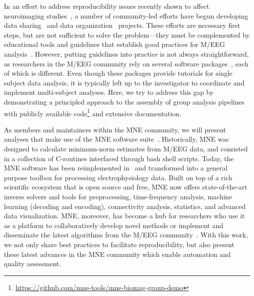 In an effort to address reproducibility issues recently shown to affect neuroimaging studies~\citep{ioannidis2005most, button2013power,Carp2012,Carp2012289}, a number of community-led efforts have begun developing data sharing~\citep{poldrack2017openfmri} and data organization~\citep{gorgolewski2016brain, galan2017meg} projects. These efforts are necessary first steps, but are not sufficient to solve the problem---they must be complemented by educational tools and guidelines that establish good practices for M/EEG analysis~\citep{gross-etal:13}. However, putting guidelines into practice is not always straightforward, as researchers in the M/EEG community rely on several software packages~\citep{tadel2011brainstorm,delorme2004eeglab,eeglab2,
oostenveld2010fieldtrip,nutmeg,litvak2011eeg}, each of which is different. Even though these packages provide tutorials for single subject data analysis, it is typically left up to the investigator to coordinate and implement multi-subject analyses. Here, we try to address this gap by demonstrating a principled approach to the assembly of group analysis pipelines with publicly available code\footnote{\url{https://github.com/mne-tools/mne-biomag-group-demo}} and extensive documentation. 

As members and maintainers within the MNE community, we will present analyses that make use of the MNE software suite~\citep{mne}. Historically, MNE was designed to calculate minimum-norm estimates from M/EEG data, and consisted in a collection of C-routines interfaced through bash shell scripts. Today, the MNE software has been reimplemented in~\citep{gramfort2013meg} and transformed into a general purpose toolbox for processing electrophysiology data. Built on top of a rich scientific ecosystem that is open source and free, MNE now offers state-of-the-art inverse solvers and tools for preprocessing, time-frequency analysis, machine learning (decoding and encoding), connectivity analysis, statistics, and advanced data visualization. MNE, moreover, has become a hub for researchers who use it as a platform to collaboratively develop novel methods or implement and disseminate the latest algorithms from the M/EEG community~\citep{engemann2015automated, smith2015regression1, smith2015regression2, haufe2014interpretation, king2014characterizing, gramfort-etal:2013, schurger2013reducing, khan2013note, larson_cortical_2012, hauk2011comparison, gramfort2010graph, rivet2009xdawn, kriegeskorte2008representational, maris_nonparametric_2007}. With this work, we not only  share best practices to facilitate reproducibility, but also present these latest advances in the MNE community which enable automation and quality assessment.

